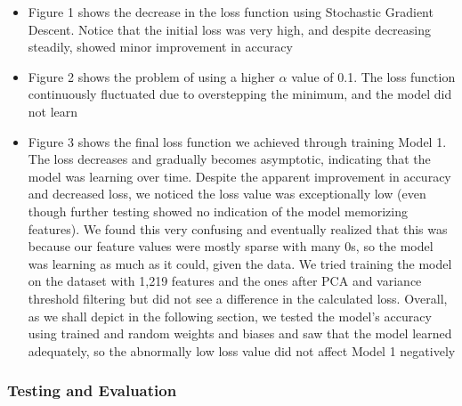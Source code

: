 \documentclass[11pt]{article}
\begin{document}
\begin{itemize}
    \item Figure 1 shows the decrease in the loss function using Stochastic Gradient Descent. Notice that the initial loss was very high, and despite decreasing steadily, showed minor improvement in accuracy

    
    \item Figure 2 shows the problem of using a higher $\alpha$ value of 0.1. The loss function continuously fluctuated due to overstepping the minimum, and the model did not learn

    
    \item Figure 3 shows the final loss function we achieved through training Model 1. The loss decreases and gradually becomes asymptotic, indicating that the model was learning over time. Despite the apparent improvement in accuracy and decreased loss, we noticed the loss value was exceptionally low (even though further testing showed no indication of the model memorizing features). We found this very confusing and eventually realized that this was because our feature values were mostly sparse with many 0s, so the model was learning as much as it could, given the data. We tried training the model on the dataset with 1,219 features and the ones after PCA and variance threshold filtering but did not see a difference in the calculated loss. Overall, as we shall depict in the following section, we tested the model's accuracy using trained and random weights and biases and saw that the model learned adequately, so the abnormally low loss value did not affect Model 1 negatively
\end{itemize}


\subsubsection{Testing and Evaluation}
\end{document}
